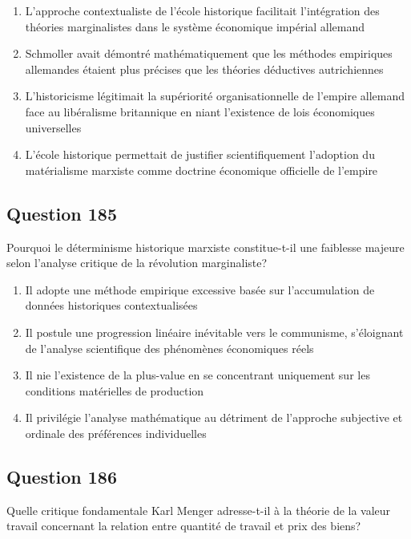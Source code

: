 \documentclass[12pt,a4paper]{article}
\begin{document}
\begin{enumerate}[label=\Alph*., leftmargin=*]
\item L'approche contextualiste de l'école historique facilitait l'intégration des théories marginalistes dans le système économique impérial allemand
\item Schmoller avait démontré mathématiquement que les méthodes empiriques allemandes étaient plus précises que les théories déductives autrichiennes
\item L'historicisme légitimait la supériorité organisationnelle de l'empire allemand face au libéralisme britannique en niant l'existence de lois économiques universelles
\item L'école historique permettait de justifier scientifiquement l'adoption du matérialisme marxiste comme doctrine économique officielle de l'empire
\end{enumerate}

\bigskip


\subsection*{Question 185}
Pourquoi le déterminisme historique marxiste constitue-t-il une faiblesse majeure selon l'analyse critique de la révolution marginaliste?

\begin{enumerate}[label=\Alph*., leftmargin=*]
\item Il adopte une méthode empirique excessive basée sur l'accumulation de données historiques contextualisées
\item Il postule une progression linéaire inévitable vers le communisme, s'éloignant de l'analyse scientifique des phénomènes économiques réels
\item Il nie l'existence de la plus-value en se concentrant uniquement sur les conditions matérielles de production
\item Il privilégie l'analyse mathématique au détriment de l'approche subjective et ordinale des préférences individuelles
\end{enumerate}

\bigskip


\subsection*{Question 186}
Quelle critique fondamentale Karl Menger adresse-t-il à la théorie de la valeur travail concernant la relation entre quantité de travail et prix des biens?
\end{document}
